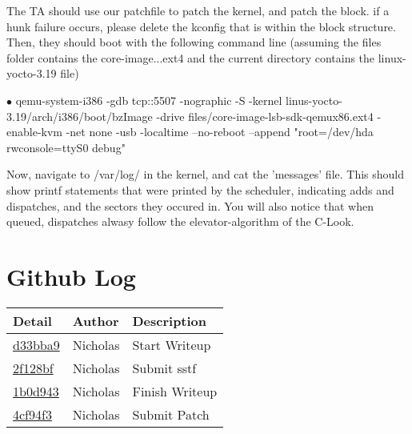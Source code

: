 \documentclass[letterpaper,10pt,fleqn,draftclsnofoot,onecolumn]{IEEEtran}
\begin{document}
	The TA should use our patchfile to patch the kernel, and patch the block. if a hunk failure occurs, please delete the kconfig that is within the block structure. Then, they should boot with the following command line (assuming the files folder contains the core-image...ext4 and the current directory contains the linux-yocto-3.19 file)
	
	$\bullet$ qemu-system-i386 -gdb tcp::5507 -nographic -S -kernel linus-yocto-3.19/arch/i386/boot/bzImage -drive files/core-image-lsb-sdk-qemux86.ext4 -enable-kvm -net none -usb -localtime --no-reboot --append "root=/dev/hda rwconsole=ttyS0 debug"
	
	Now, navigate to /var/log/ in the kernel, and cat the 'messages' file. This should show printf statements that were printed by the scheduler, indicating adds and dispatches, and the sectors they occured in. You will also notice that when queued, dispatches alwasy follow the elevator-algorithm of the C-Look.
	 
	\section*{ Github Log }
	\begin{tabular}{l l p{1.5in}}\textbf{Detail} & \textbf{Author} & \textbf{Description}\\\hline
		\href{https://github.com/Skinnern/CS444/commit/d33bba95acdbdb949f919057af273d70d5d77414}{d33bba9} & Nicholas & Start Writeup\\\hline
		\href{https://github.com/Skinnern/CS444/commit/2f128bf456ff019ed55ea0bd77628037ec81b99d}{2f128bf} & Nicholas & Submit sstf\\\hline
		\href{https://github.com/Skinnern/CS444/commit/1b0d943f41d9c69e281581bb7719b96edfcbe6d4}{1b0d943} & Nicholas & Finish Writeup\\\hline
		\href{https://github.com/Skinnern/CS444/commit/4cf94f3f93256b0f0e88935014df6f7898c1ed3d}{4cf94f3} & Nicholas & Submit Patch\\\hline
	\end{tabular}
	
	
\end{document}
